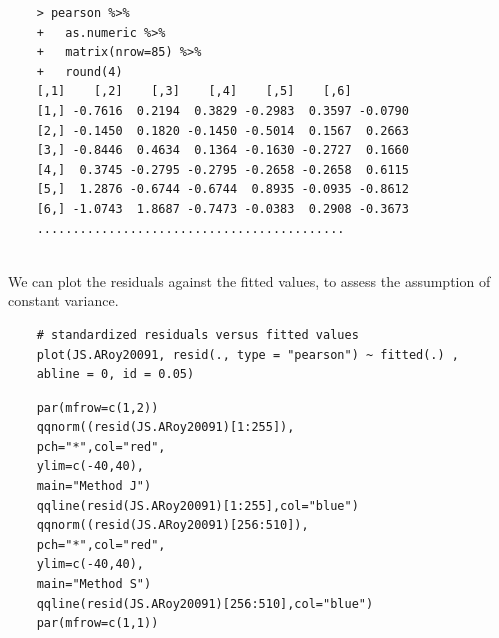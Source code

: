 \documentclass[Main.tex]{subfiles}
\begin{document}
\begin{framed}
	\begin{verbatim}
	> pearson %>%
	+   as.numeric %>% 
	+   matrix(nrow=85) %>%
	+   round(4) 
	[,1]    [,2]    [,3]    [,4]    [,5]    [,6]
	[1,] -0.7616  0.2194  0.3829 -0.2983  0.3597 -0.0790
	[2,] -0.1450  0.1820 -0.1450 -0.5014  0.1567  0.2663
	[3,] -0.8446  0.4634  0.1364 -0.1630 -0.2727  0.1660
	[4,]  0.3745 -0.2795 -0.2795 -0.2658 -0.2658  0.6115
	[5,]  1.2876 -0.6744 -0.6744  0.8935 -0.0935 -0.8612
	[6,] -1.0743  1.8687 -0.7473 -0.0383  0.2908 -0.3673
	...........................................
	
	\end{verbatim}
\end{framed}

We can plot the residuals against the fitted values, to assess the assumption of constant variance. 
\begin{framed}
	\begin{verbatim}
	# standardized residuals versus fitted values 
	plot(JS.ARoy20091, resid(., type = "pearson") ~ fitted(.) , 
	abline = 0, id = 0.05)
	\end{verbatim}
\end{framed}


\begin{framed}
	\begin{verbatim}
	par(mfrow=c(1,2))
	qqnorm((resid(JS.ARoy20091)[1:255]),
	pch="*",col="red",
	ylim=c(-40,40),
	main="Method J")
	qqline(resid(JS.ARoy20091)[1:255],col="blue")
	qqnorm((resid(JS.ARoy20091)[256:510]),
	pch="*",col="red",
	ylim=c(-40,40),
	main="Method S")
	qqline(resid(JS.ARoy20091)[256:510],col="blue")
	par(mfrow=c(1,1))
	\end{verbatim}	
\end{framed}
\end{document}
